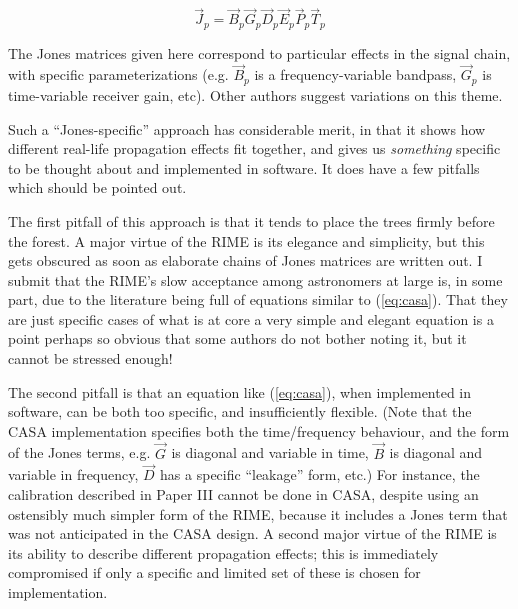 \documentclass[referee]{aa}
\newcommand{\jones}[2]{\vec {#1}_{#2}}
\begin{document}
\begin{equation}\label{eq:casa}
\jones{J}{p} = \jones{B}{p} \jones{G}{p} \jones{D}{p} \jones{E}{p} \jones{P}{p} \vec  T_p
\end{equation}

The Jones matrices given here correspond to particular effects in the signal chain, with specific parameterizations (e.g. $\jones{B}{p}$ is a frequency-variable bandpass, $\jones{G}{p}$ is time-variable receiver gain, etc). Other authors \citep{Rau:DDEs} suggest variations on this theme. 

Such a ``Jones-specific'' approach has considerable merit, in that it shows how different real-life propagation effects fit together, and gives us {\em something} specific to be thought about and implemented in software. It does have a few pitfalls which should be pointed out.

The first pitfall of this approach is that it tends to place the trees firmly before the forest. A major virtue of the RIME is its elegance and simplicity, but this gets obscured as soon as elaborate chains of Jones matrices are written out.  I submit that the RIME's slow acceptance among astronomers at large is, in some part, due to the literature being full of equations similar to (\ref{eq:casa}). That they are just specific cases of what is at core a very simple and elegant equation is a point perhaps so obvious that some authors do not bother noting it, but it cannot be stressed enough!

The second pitfall is that an equation like (\ref{eq:casa}), when implemented in software, can be both too specific, and insufficiently flexible. (Note that the CASA implementation specifies both the time/frequency behaviour, and the form of the Jones terms, e.g. $\jones{G}{}$ is diagonal and variable in time, $\jones{B}{}$ is diagonal and variable in frequency,
$\jones{D}{}$ has a specific ``leakage'' form, etc.) For instance, the calibration described in Paper III cannot be done in CASA, despite using an ostensibly much simpler form of the RIME, because it includes a Jones term that was not anticipated in the CASA design. A second major virtue of the RIME is its ability to describe different propagation effects; this is immediately compromised if only a specific and limited set of these is chosen for implementation.
\end{document}

